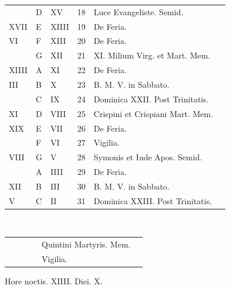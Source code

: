 \begin{center}
\begin{tabular}{l | l | l | r | l l}
\color{Red}  & D & \color{Red} XV & 18 & Luce Evangeliste. Semid. & \\
\color{Red} XVII & E & \color{Red} XIIII & 19 & De Feria. & \color{Red} \\
\color{Red} VI & F & \color{Red} XIII & 20 & De Feria. & \color{Red} \\
\color{Red}  & G & \color{Red} XII & 21 & \multicolumn{2}{l}{\color{Red} XI. Milium Virg. et Mart. Mem.} \\
\color{Red} XIIII & \color{Red} A & \color{Red} XI & 22 & De Feria. & \color{Red} \\
\color{Red} III & B & \color{Red} X & 23 & B. M. V. in Sabbato.  & \color{Red} \\
\color{Red}  & C & \color{Red} IX & 24 & Dominica XXII. Post Trinitatis. & \color{Red} \\
\color{Red} XI & D & \color{Red} VIII & 25 & Crispini et Crispiani Mart. Mem. & \color{Red} \\
\color{Red} XIX & E & \color{Red} VII & 26 & De Feria. & \color{Red} \\
\color{Red}  & F & \color{Red} VI & 27 &  \qquad \color{Red} Vigilia. \\
\color{Red} VIII & G & \color{Red} V & 28 & \color{Red} Symonis et Iude Apos. Semid. & \color{Red} \\
\color{Red}  & \color{Red} A & \color{Red} IIII & 29 & De Feria. & \color{Red} \\
\color{Red} XII & B & \color{Red} III & 30 & B. M. V. in Sabbato.  & \color{Red} \\
\color{Red} V & C & \color{Red} II & 31 & Dominica XXIII. Post Trinitatis. \\
\end{tabular}
\newline  
\end{center}

\begin{center}
\begin{tabular}{l | l | l | r | l l}
& & & & \quad Quintini Martyris. Mem. & \\
& & & & \qquad Vigilia. \color{Red} \\
\end{tabular}
\newline \color{Red} Hore noctis. XIIII. Diei. X.
\end{center}



\color{Red}\color{black}

